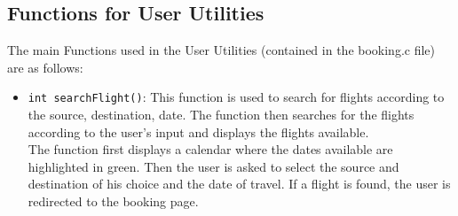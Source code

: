 \documentclass[a4paper]{scrartcl}
\begin{document}
\subsection{Functions for User Utilities}
The main Functions used in the User Utilities (contained in the booking.c file) are as follows:
\begin{itemize}
    \item  \texttt{int searchFlight()}: This function is used to search for flights according to the source, destination, date. The function then searches for the flights according to the user's input and displays the flights available.\\
    The function first displays a calendar where the dates available are highlighted in green. Then the user is asked to select the source and destination of his choice and the date of travel. If a flight is found, the user is redirected to the booking page. 


\end{itemize}
\end{document}
